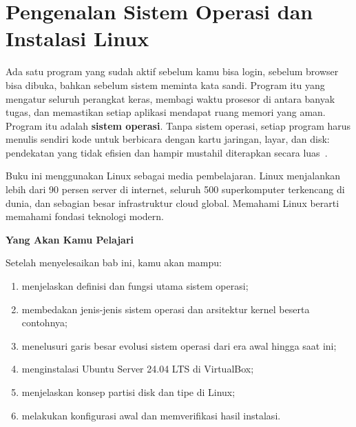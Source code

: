 
\chapter{Pengenalan Sistem Operasi dan Instalasi Linux}
\label{ch:introduction}


Ada satu program yang sudah aktif sebelum kamu bisa login, sebelum browser bisa dibuka,
bahkan sebelum sistem meminta kata sandi. Program itu yang mengatur seluruh perangkat
keras, membagi waktu prosesor di antara banyak tugas, dan memastikan setiap aplikasi
mendapat ruang memori yang aman. Program itu adalah \textbf{sistem operasi}. Tanpa
sistem operasi, setiap program harus menulis sendiri kode untuk berbicara dengan kartu
jaringan, layar, dan disk: pendekatan yang tidak efisien dan hampir mustahil diterapkan
secara luas~\cite{silberschatz2018operating, ward2021how}.

Buku ini menggunakan Linux sebagai media pembelajaran. Linux menjalankan lebih dari 90
persen server di internet, seluruh 500 superkomputer terkencang di dunia, dan sebagian
besar infrastruktur cloud global. Memahami Linux berarti memahami fondasi teknologi
modern.

\textbf{Yang Akan Kamu Pelajari}

Setelah menyelesaikan bab ini, kamu akan mampu:

\begin{enumerate}
    \item menjelaskan definisi dan fungsi utama sistem operasi;
    \item membedakan jenis-jenis sistem operasi dan arsitektur kernel beserta contohnya;
    \item menelusuri garis besar evolusi sistem operasi dari era awal hingga saat ini;
    \item menginstalasi Ubuntu Server 24.04 LTS di  VirtualBox;
    \item menjelaskan konsep partisi disk dan tipe  di Linux;
    \item melakukan konfigurasi awal dan memverifikasi hasil instalasi.
\end{enumerate}

